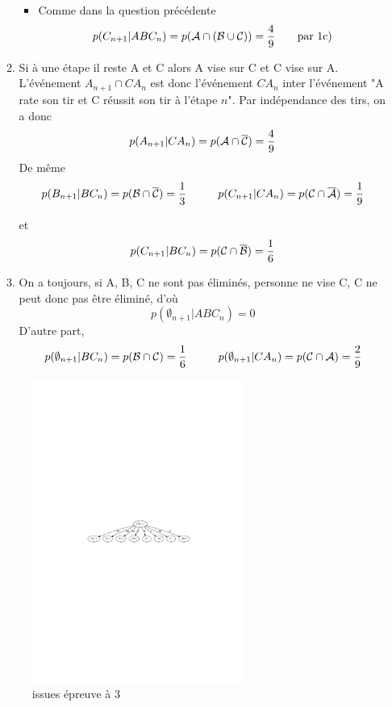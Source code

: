 \begin{enumerate}
\begin{enumerate}
\begin{itemize}
\item  Comme dans la question précédente 
 $$p(C_{n+1}|ABC_n)= p({\cal A}\cap ({\cal B}\cup {\cal C)})=\frac 49 \qquad \text{par 1c)}$$
\end{itemize}
\item Si à une étape il reste A et C alors A vise sur C et C vise sur A. L'événement $A_{n+1}\cap CA_n$ est donc l'événement $CA_n$ inter l'événement "A rate son tir et C réussit son tir  à l'étape $n$". Par indépendance des tirs, on a donc 
$$p(A_{n+1}|CA_n)= p( {{\cal A}}\cap \overline{{\cal C}})=\frac 49 $$
De même
\begin{displaymath}
p(B_{n+1}|BC_n)= p({{\cal B}}\cap \overline{{\cal C}})=\frac 13\hspace{1cm}
 p(C_{n+1}|CA_{n})= p({{\cal C}}\cap \overline{{\cal A}})=\frac 19  
\end{displaymath}

 et $$p(C_{n+1}|BC_n)= p({{\cal C}}\cap \overline{{\cal B}})=\frac 16$$
\item On a toujours, si A, B, C ne sont pas éliminés, personne ne vise C, C  ne peut donc pas  être éliminé, d'où
$$p(\emptyset_{n+1}|ABC_n)=0$$
D'autre part,
\begin{displaymath}
p(\emptyset_{n+1}|BC_n)= p({{\cal B}}\cap {{\cal C}})=\frac 16
\hspace{1cm} 
p(\emptyset_{n+1}|CA_n)= p({{\cal C}}\cap {{\cal A}})=\frac 29
\end{displaymath}
\end{enumerate} 
\begin{figure}[h!]
  \centering
  \includegraphics[width=7cm]{./Cproba1_2.pdf}
  \caption{issues épreuve à 3}
  \label{fig:Cproba1_fig2}
\end{figure}


\end{enumerate}
